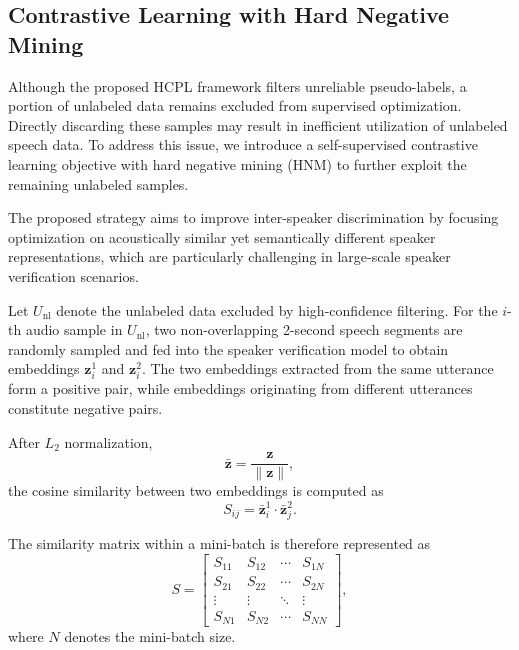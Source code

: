 \documentclass[lettersize,journal]{IEEEtran}
\begin{document}
\subsection{Contrastive Learning with Hard Negative Mining}

Although the proposed HCPL framework filters unreliable pseudo-labels, a portion of unlabeled data remains excluded from supervised optimization. Directly discarding these samples may result in inefficient utilization of unlabeled speech data. To address this issue, we introduce a self-supervised contrastive learning objective with hard negative mining (HNM) to further exploit the remaining unlabeled samples.

The proposed strategy aims to improve inter-speaker discrimination by focusing optimization on acoustically similar yet semantically different speaker representations, which are particularly challenging in large-scale speaker verification scenarios.

Let $U_{\mathrm{nl}}$ denote the unlabeled data excluded by high-confidence filtering. For the $i$-th audio sample in $U_{\mathrm{nl}}$, two non-overlapping 2-second speech segments are randomly sampled and fed into the speaker verification model to obtain embeddings $\mathbf{z}_i^1$ and $\mathbf{z}_i^2$. The two embeddings extracted from the same utterance form a positive pair, while embeddings originating from different utterances constitute negative pairs.

After $L_2$ normalization,
\begin{equation}
\bar{\mathbf{z}}
=
\frac{\mathbf{z}}{\|\mathbf{z}\|},
\end{equation}
the cosine similarity between two embeddings is computed as
\begin{equation}
S_{ij}
=
\bar{\mathbf{z}}_i^1
\cdot
\bar{\mathbf{z}}_j^2.
\end{equation}

The similarity matrix within a mini-batch is therefore represented as
\begin{equation}
S=
\begin{bmatrix}
S_{11} & S_{12} & \cdots & S_{1N} \\
S_{21} & S_{22} & \cdots & S_{2N} \\
\vdots & \vdots & \ddots & \vdots \\
S_{N1} & S_{N2} & \cdots & S_{NN}
\end{bmatrix},
\end{equation}
where $N$ denotes the mini-batch size.
\end{document}
